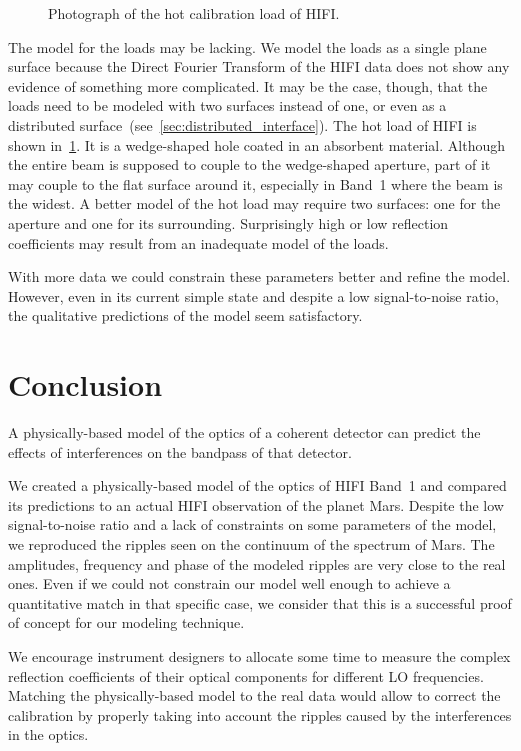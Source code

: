 \begin{figure}
    \centering
    
    \caption{Photograph of the hot calibration load of HIFI.}
    \label{fig:hbb_photo}
\end{figure}
The model for the loads may be lacking.
We model the loads as a single plane surface because the Direct Fourier Transform of the HIFI data does not show any evidence of something more complicated.
It may be the case, though, that the loads need to be modeled with two surfaces instead of one, or even as a distributed surface~(see~\vref{sec:distributed_interface}).
The hot load of HIFI is shown in~\cref{fig:hbb_photo}.
It is a wedge-shaped hole coated in an absorbent material.
Although the entire beam is supposed to couple to the wedge-shaped aperture, part of it may couple to the flat surface around it, especially in Band~1 where the beam is the widest.
A better model of the hot load may require two surfaces: one for the aperture and one for its surrounding.
Surprisingly high or low reflection coefficients may result from an inadequate model of the loads.


With more data we could constrain these parameters better and refine the model.
However, even in its current simple state and despite a low signal-to-noise ratio,
the qualitative predictions of the model seem satisfactory.





\FloatBarrier



\section{Conclusion}
A physically-based model of the optics of a coherent detector can predict the effects of interferences on the bandpass of that detector.

We created a physically-based model of the optics of HIFI Band~1 and compared its predictions to an actual HIFI observation of the planet Mars.
Despite the low signal-to-noise ratio and a lack of constraints on some parameters of the model, we reproduced the ripples seen on the continuum of the spectrum of Mars.
The amplitudes, frequency and phase of the modeled ripples are very close to the real ones.
Even if we could not constrain our model well enough to achieve a quantitative match in that specific case,
we consider that this is a successful proof of concept for our modeling technique.

We encourage instrument designers to allocate some time to measure the complex reflection coefficients of their optical components for different LO frequencies.
Matching the physically-based model to the real data would allow to correct the calibration by properly taking into account the ripples caused by the interferences in the optics.
